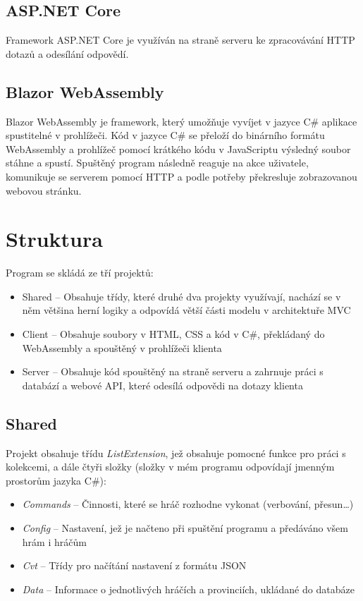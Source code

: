 \documentclass[a4paper,12pt]{article}
\begin{document}
\subsection{ASP.NET Core}
Framework ASP.NET Core je využíván na straně serveru ke zpracovávání HTTP dotazů a odesílání odpovědí.
\subsection{Blazor WebAssembly}
Blazor WebAssembly je framework, který umožňuje vyvíjet v jazyce C\# aplikace spustitelné v prohlížeči. Kód v jazyce C\# se přeloží do binárního formátu WebAssembly a prohlížeč pomocí krátkého kódu v JavaScriptu výsledný soubor stáhne a spustí. Spuštěný program následně reaguje na akce uživatele, komunikuje se serverem pomocí HTTP a podle potřeby překresluje zobrazovanou webovou stránku.

\section{Struktura}
Program se skládá ze tří projektů:
\begin{itemize}
\item Shared -- Obsahuje třídy, které druhé dva projekty využívají, nachází se v něm většina herní logiky a odpovídá větší části modelu v architektuře MVC\cite{mvc}
\item Client -- Obsahuje soubory v HTML, CSS a kód v C\#, překládaný do WebAssembly a spouštěný v prohlížeči klienta
\item Server -- Obsahuje kód spouštěný na straně serveru a zahrnuje práci s databází a webové API, které odesílá odpovědi na dotazy klienta
\end{itemize}
\subsection{Shared}
Projekt obsahuje třídu \textit{ListExtension}, jež obsahuje pomocné funkce pro práci s kolekcemi, a dále čtyři složky (složky v mém programu odpovídají jmenným prostorům jazyka C\#):
\begin{itemize}
\item\textit{Commands} -- Činnosti, které se hráč rozhodne vykonat (verbování, přesun\ldots)
\item\textit{Config} -- Nastavení, jež je načteno při spuštění programu a předáváno všem hrám i hráčům
\item\textit{Cvt} -- Třídy pro načítání nastavení z formátu JSON
\item\textit{Data} -- Informace o jednotlivých hráčích a provinciích, ukládané do databáze
\end{itemize}
\end{document}
